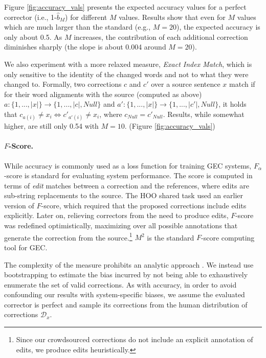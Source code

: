 \documentclass[letterpaper, 11pt]{article}
\newcommand{\lc}[1]{\footnote{\color{blue}LC: #1}}
\begin{document}
Figure \ref{fig:accuracy_vals} presents the expected accuracy values for a perfect
corrector (i.e., 1-$\hat{b}_M$) for different  $M$ values. 
Results show that even for $M$ values which are much larger than the standard (e.g., $M=20$),
the expected accuracy is only about 0.5. As $M$ increases, the contribution of each additional correction 
diminishes sharply (the slope is about 0.004 around $M=20$).

We also experiment with a more relaxed measure, {\it Exact Index Match}, which is only sensitive to the identity of the changed words and not to what they were changed to. 
Formally, two corrections $c$ and $c'$ over a source sentence $x$ match if for their word alignments with the source (computed as above) $a:\{1,...,\left|x\right|\} \rightarrow \{1,...,\left|c\right|,Null\}$
and $a':\{1,...,\left|x\right|\} \rightarrow \{1,...,\left|c'\right|,Null\}$, it holds that $c_{a\left(i\right)} \neq x_{i} \Leftrightarrow c'_{a'\left(i\right)} \neq x_{i}$, where $c_{Null}=c'_{Null}$.
Results, while somewhat higher, are still only 0.54 with $M=10$. (Figure \ref{fig:accuracy_vals})


\paragraph{$F$-Score.}
While accuracy is commonly used as a loss function for training GEC systems,
$F_\alpha$-score is standard for evaluating system performance.%
The score is computed in terms of {\it edit} matches between a correction and the references, where edits are sub-string replacements to the source.
The HOO shared task used an earlier version of $F$-score, which required that the proposed corrections include edits explicitly.
Later on, relieving correctors from the need to produce edits, $F$-score was redefined optimistically, maximizing over all possible annotations that generate the correction from the source.\footnote{Since our crowdsourced corrections
	do not include an explicit annotation of edits, we produce edits heuristically.}
$M^2$ \cite{dahlmeier2012better} is the standard $F$-score computing tool for GEC.

The complexity of the measure prohibits an analytic approach \cite{yeh2000more}.
We instead use bootstrapping to estimate the bias incurred by not being able to exhaustively enumerate the set of valid corrections.
As with accuracy, in order to avoid confounding our results with system-specific biases,
we assume the evaluated corrector is perfect and sample its corrections from the human distribution of corrections $\mathcal{D}_x$.
\end{document}
